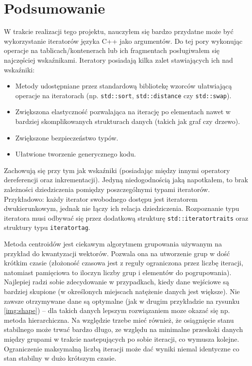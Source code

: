 \section{Podsumowanie}

W trakcie realizacji tego projektu, nauczyłem się bardzo przydatne może być wykorzystanie iteratorów języka C++ jako argumentów. Do tej pory wykonując operacje na tablicach/kontenerach lub ich fragmentach posługiwałem się najczęściej wskaźnikami. Iteratory posiadają kilka zalet stawiających ich nad wskaźniki:

\begin{itemize}
	\item Metody udostępniane przez standardową bibliotekę wzorców ułatwiającą operacje na iteratorach (np. \texttt{std::sort}, \texttt{std::distance} czy \texttt{std::swap}).
	\item Zwiększona elastyczność pozwalająca na iterację po elementach nawet w bardziej skomplikowanych strukturach danych (takich jak graf czy drzewo).
	\item Zwiększone bezpieczeństwo typów.
	\item Ułatwione tworzenie generycznego kodu.
\end{itemize}

Zachowują się przy tym jak wskaźniki (posiadając między innymi operatory dereferencji oraz inkrementacji). Jedyną niedogodnością jaką napotkałem, to brak zależności dziedziczenia pomiędzy poszczególnymi typami iteratorów. Przykładowo: każdy iterator swobodnego dostępu jest iteratorem dwukierunkowym, jednak nie łączy ich relacja dziedziczenia. Rozpoznanie typu iteratora musi odbywać się przez dodatkową strukturę \texttt{std::iterator\textunderscore traits} oraz struktury typu \texttt{\textunderscore iterator\textunderscore tag}.

Metoda centroidów jest ciekawym algorytmem grupowania używanym na przykład do kwantyzacji wektorów. Pozwala ona na utworzenie grup w dość krótkim czasie (złożoność czasowa jest z reguły ograniczona przez liczbę iteracji, natomiast pamięciowa to iloczyn liczby grup i elementów do pogrupowania). Najlepiej radzi sobie zdecydowanie w przypadkach, kiedy dane wejściowe są bardziej skupione (w określonych miejscach natężenie danych jest większe). Nie zawsze otrzymywane dane są optymalne (jak w drugim przykładzie na rysunku \ref{img:shape}) -- dla takich danych lepszym rozwiązaniem moze okazać się np. metoda hierarchiczna. Na względzie trzebe mieć również, że osiągnięcie stanu stabilnego może trwać bardzo długo, ze względu na minimalne przeskoki danych między grupami w trakcie nastepujących po sobie iteracji, co wymusza kolejne. Ograniczenie maksymalną liczbą iteracji może dać wyniki niemal identyczne co stan stabilny w dużo krótszym czasie.